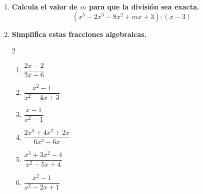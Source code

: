 \documentclass[a4paper,12pt]{article}
\begin{document}
\begin{enumerate}
    \item \textbf{Calcula el valor de $m$ para que la división sea exacta.}
        \[
        (x^5 - 2x^3 - 8x^2 + mx + 3) : (x - 3)
        \]

    \item \textbf{Simplifica estas fracciones algebraicas.}
        \begin{multicols}{2}
        \begin{enumerate}[label=\textbf{\alph*)}]
            \item $\dfrac{2x - 2}{2x - 6}$
            
            \vspace{0.4cm}
            
            \item $\dfrac{x^2 - 1}{x^2 - 4x + 3}$
            
            \vspace{0.4cm}
            
            \item $\dfrac{x - 1}{x^2 - 1}$
            
            \columnbreak
            
            \item $\dfrac{2x^3 + 4x^2 + 2x}{6x^3 - 6x}$
            
            \vspace{0.4cm}
            
            \item $\dfrac{x^3 + 3x^2 - 4}{x^2 - 5x + 4}$
            
            \vspace{0.4cm}
            
            \item $\dfrac{x^2 - 1}{x^2 - 2x + 1}$
        \end{enumerate}
        \end{multicols}


\end{enumerate}
\end{document}
